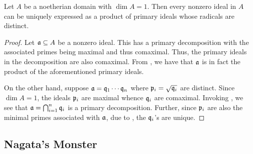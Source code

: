 \begin{lemma}
    Let $A$ be a noetherian domain with $\dim A = 1$. Then every nonzero ideal in $A$ can be uniquely expressed as a product of primary ideals whose radicals are distinct.
\end{lemma}
\begin{proof}
    Let $\mathfrak a\subseteq A$ be a nonzero ideal. This has a primary decomposition with the associated primes being maximal and thus comaximal. Thus, the primary ideals in the decomposition are also comaximal. From , we have that $\mathfrak a$ is in fact the product of the aforementioned primary ideals.

    On the other hand, suppose $\mathfrak a = \mathfrak q_1\cdots\mathfrak q_n$ where $\mathfrak p_i = \sqrt{\mathfrak q_i}$ are distinct. Since $\dim A = 1$, the ideals $\mathfrak p_i$ are maximal whence $\mathfrak q_i$ are comaximal. Invoking , we see that $\mathfrak a = \bigcap_{i = 1}^n\mathfrak q_i$ is a primary decomposition. Further, since $\mathfrak p_i$ are also the minimal primes associated with $\mathfrak a$, due to , the $\mathfrak q_i$'s are unique.
\end{proof}

\subsection{Nagata's Monster}

